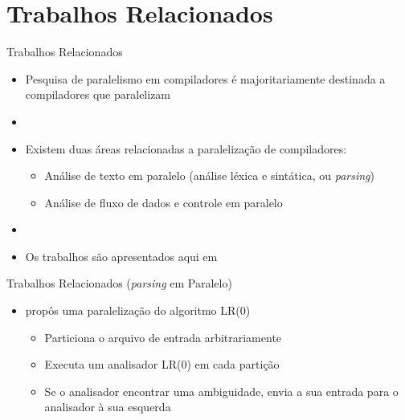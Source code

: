\section{Trabalhos Relacionados}

\begin{frame}{Trabalhos Relacionados}
    \begin{itemize}
        \item Pesquisa de paralelismo em compiladores é majoritariamente destinada a compiladores que paralelizam
        \item[]
        \item Existem duas áreas relacionadas a paralelização de compiladores:
        \begin{itemize}
            \item Análise de texto em paralelo (análise léxica e sintática, ou \textit{parsing})
            \item Análise de fluxo de dados e controle em paralelo
        \end{itemize}
        \item[]
        \item Os trabalhos são apresentados aqui em {\color{blue}{ordem cronológica}}
    \end{itemize}
\end{frame}

\begin{frame}{Trabalhos Relacionados (\textit{parsing} em Paralelo)}
    
    \begin{itemize}
        \item \cite{Mickunas:1978:PCM:800127.804105} propôs uma paralelização do algoritmo LR(0)
            \begin{itemize}
                \item Particiona o arquivo de entrada arbitrariamente
                \item Executa um analisador LR(0) em cada partição
                \item Se o analisador encontrar uma ambiguidade, envia a sua entrada para o analisador à sua esquerda
            \end{itemize}
    \end{itemize}
\end{frame}

